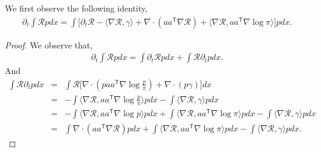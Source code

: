 \documentclass[11pt,reqno]{amsart}
\newcommand{\la}{\langle}
\newcommand{\ra}{\rangle}
\newcommand{\ts}{\mathsf{T}}
\newcommand{\beaa}{\begin{eqnarray*}}
\newcommand{\eeaa}{\end{eqnarray*}}
\def\pa{\partial}
\def\qed{ \hfill \vrule width.25cm height.25cm depth0cm\smallskip}
\begin{document}
\begin{lemma}We first observe the following identity,
	\beaa 
	\pa_t\int \mathcal R {p}  dx =\int\Big[  \pa_t\mathcal R -\la \nabla \mathcal R,\gamma\ra +\nabla\cdot(aa^{\ts}\nabla\mathcal{R})+\la \nabla \mathcal R, aa^{\ts}\nabla\log\pi\ra \Big]{p}  dx.
	\eeaa 
\end{lemma}
\begin{proof}
	We observe that,
	\beaa
	\pa_t \int \mathcal R {p}  dx=\int \pa_t\mathcal R {p}  dx +\int \mathcal R \pa_t{p}  dx.
	\eeaa 
	And
\beaa
\int \mathcal{R}\pa_t{p}  dx&=& \int \mathcal{R}\Big[\nabla\cdot({p}  aa^{\ts}\nabla\log\frac{{p} }{\pi} )+\nabla\cdot({p} \gamma) \Big]dx\\
&=&-\int \la \nabla \mathcal{R}, aa^{\ts}\nabla\log\frac{{p} }{\pi}\ra{p}  dx-\int \la \nabla \mathcal{R},\gamma\ra {p}  dx\\
&=& -\int \la \nabla \mathcal R, aa^{\ts}\nabla \log {p} \ra {p}  dx+\int \la \nabla \mathcal R, aa^{\ts}\nabla \log \pi\ra {p}  dx -\int \la \nabla\mathcal R, \gamma\ra {p}  dx\\
&=& \int \nabla\cdot (aa^{\ts} \nabla \mathcal R) {p}  dx+\int \la \nabla \mathcal R, aa^{\ts}\nabla \log \pi\ra {p}  dx -\int \la \nabla\mathcal R, \gamma\ra {p}  dx.
\eeaa \qed
\end{proof}
\end{document}
